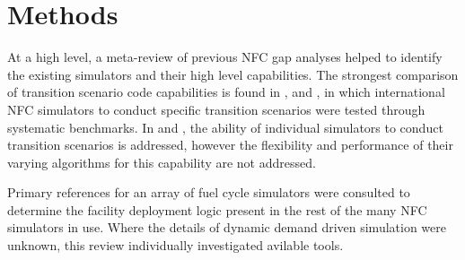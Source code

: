 \section{Methods}
At a high level, a meta-review of previous \gls{NFC} gap analyses 
helped to identify the existing simulators and their high 
level capabilities. The strongest comparison of transition scenario code 
capabilities is found in \cite{boucher_international_2010}, 
\cite{brown_identification_2016} and \cite{mccarthy_benchmark_2012}, in which 
international \gls{NFC} simulators to conduct specific transition scenarios 
were tested through systematic benchmarks. In 
\cite{carre_overview_2009} and \cite{hoffman_expanded_2016}, the ability of individual 
simulators to conduct transition scenarios is addressed, however the 
flexibility and performance of their varying algorithms for this capability are 
not addressed.

Primary references for an array of fuel cycle simulators were consulted to 
determine the facility deployment logic present in the rest of the many 
\gls{NFC} simulators in use. Where the details of dynamic demand driven 
simulation were unknown, this review individually investigated avilable tools. 
